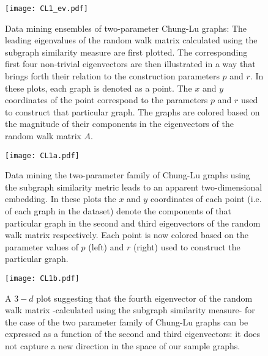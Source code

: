 \begin{figure}
  \begin{center}
    \texttt{[image: CL1\_ev.pdf]}
    \caption{\label{fig:CL1} Data mining ensembles of two-parameter
      Chung-Lu graphs: The leading eigenvalues of the random walk
      matrix calculated using the subgraph similarity measure are
      first plotted.  The corresponding first four non-trivial
      eigenvectors are then illustrated in a way that brings forth
      their relation to the construction parameters $p$ and $r$.  In
      these plots, each graph is denoted as a point.  The $x$ and $y$
      coordinates of the point correspond to the parameters $p$ and
      $r$ used to construct that particular graph.  The graphs are
      colored based on the magnitude of their components in the
      eigenvectors of the random walk matrix $A$.  }
  \end{center}
\end{figure}

\begin{figure}
  \begin{center}
    \texttt{[image: CL1a.pdf]}
    \caption{\label{fig:CL1a}
      Data mining the two-parameter family of Chung-Lu graphs using the subgraph similarity metric
      leads to an apparent two-dimensional
      embedding.
      In these plots the $x$ and $y$ coordinates of each point (i.e. of each graph in the dataset)
      denote the components
      of that particular graph in the second and third eigenvectors of the random walk matrix respectively.
      Each point is now colored based on the parameter values of $p$
      (left) and $r$ (right) used to construct the particular graph.
    }
  \end{center}
\end{figure}

\begin{figure}
  \begin{center}
    \texttt{[image: CL1b.pdf]}
    \caption{\label{fig:CL1b} A $3-d$ plot suggesting that the fourth
      eigenvector of the random walk matrix -calculated using the
      subgraph similarity measure- for the case of the two parameter
      family of Chung-Lu graphs can be expressed as a function of the
      second and third eigenvectors: it does not capture a new
      direction in the space of our sample graphs.  }
  \end{center}
\end{figure}


